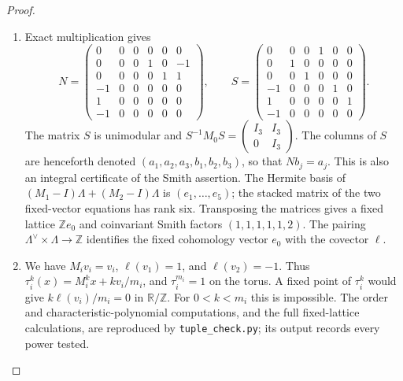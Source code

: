 \documentclass[11pt,a4paper]{article}
\theoremstyle{definition}
\begin{document}
\begin{proof}
\begin{enumerate}[label=\arabic*.]
\item Exact multiplication gives
\[
N=\begin{pmatrix}
0&0&0&0&0&0\\0&0&0&1&0&-1\\0&0&0&0&1&1\\
-1&0&0&0&0&0\\1&0&0&0&0&0\\-1&0&0&0&0&0
\end{pmatrix},\qquad
S=\begin{pmatrix}
0&0&0&1&0&0\\0&1&0&0&0&0\\0&0&1&0&0&0\\
-1&0&0&0&1&0\\1&0&0&0&0&1\\-1&0&0&0&0&0
\end{pmatrix}.
\]
The matrix $S$ is unimodular and
$S^{-1}M_0S=\left(\begin{smallmatrix}I_3&I_3\\0&I_3\end{smallmatrix}\right)$.
The columns of $S$ are henceforth denoted
$(a_1,a_2,a_3,b_1,b_2,b_3)$, so that $Nb_j=a_j$.
This is also an integral certificate of the Smith assertion.
The Hermite basis of
$(M_1-I)\Lambda+(M_2-I)\Lambda$ is $(e_1,\ldots,e_5)$;
the stacked matrix of the two fixed-vector equations has rank six.
Transposing the matrices gives a fixed lattice $\mathbb Ze_0$ and
coinvariant Smith factors $(1,1,1,1,1,2)$.  The pairing
$\Lambda^\vee\times\Lambda\longrightarrow\mathbb Z$ identifies the
fixed cohomology vector $e_0$ with the covector $\ell$.

\item We have $M_iv_i=v_i$, $\ell(v_1)=1$, and $\ell(v_2)=-1$.
Thus $\tau_i^k(x)=M_i^kx+kv_i/m_i$, and $\tau_i^{m_i}=1$ on the
torus.  A fixed point of $\tau_i^k$ would give
$k\ell(v_i)/m_i=0$ in $\mathbb R/\mathbb Z$.  For
$0<k<m_i$ this is impossible.  The order and characteristic-polynomial
computations, and the full fixed-lattice calculations, are reproduced by
\texttt{tuple\_check.py}; its output records every power tested.

\end{enumerate}
\end{proof}
\end{document}
